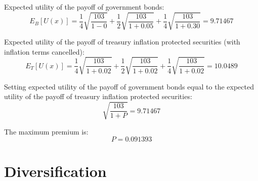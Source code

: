\documentclass{article}
\begin{document}
\begin{enumerate}[i.]
        Expected utility of the payoff of government bonds:
        $$ E_{B}[ U( x ) ] = \frac{ 1 }{ 4 } \sqrt{ \frac{ 103 }{ 1 - 0 } }
        + \frac{ 1 }{ 2 } \sqrt{ \frac{ 103 }{ 1 + 0.05 } } + \frac{ 1 }{ 4 }
        \sqrt{ \frac{ 103 }{ 1 + 0.30 } } = 9.71467$$

        Expected utility of the payoff of treasury inflation protected
        securities (with inflation terms cancelled):
        $$ E_{T}[ U( x ) ] = \frac{ 1 }{ 4 } \sqrt{ \frac{ 103  }{ 1 + 0.02 } }
        + \frac{ 1 }{ 2 } \sqrt{ \frac{ 103 }{ 1 + 0.02 } } + \frac{ 1 }{ 4 }
        \sqrt{ \frac{ 103 } { 1 + 0.02 } } = 10.0489$$

        Setting expected utility of the payoff of government bonds equal to
        the expected utility of the payoff of treasury inflation protected
        securities:
        $$ \sqrt{ \frac{ 103 }{ 1 + P } } = 9.71467 $$

        The maximum premium is:
        $$ P = 0.091393 $$

\end{enumerate}

\section{ Diversification }
\end{document}
